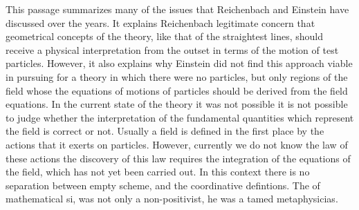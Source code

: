 \documentclass[draft]{article}
\begin{document}
%
This passage summarizes many of the issues that Reichenbach and Einstein have discussed over the years. It explains Reichenbach legitimate concern that geometrical concepts of the theory, like that of the straightest lines, should receive a physical interpretation from the outset in terms of the motion of test particles. However, it also explains why Einstein did not find this approach viable in pursuing for a theory in which there were no particles, but only regions of the field whose the equations of motions of particles should be derived from the field equations. In the current state of the theory it was not possible it is not possible to judge whether the interpretation of the fundamental quantities which represent the field is correct or not. Usually a field is defined in the first place by the actions that it exerts on particles. However, currently we do not know the law of these actions the discovery of this law requires the integration of the equations of the field, which has not yet been carried out. In this context there is no separation between empty scheme, and the coordinative defintions. The of mathematical si, was not only a non-positivist, he was a tamed metaphysicias. 



\printshorthands
\printbibliography
\end{document}
